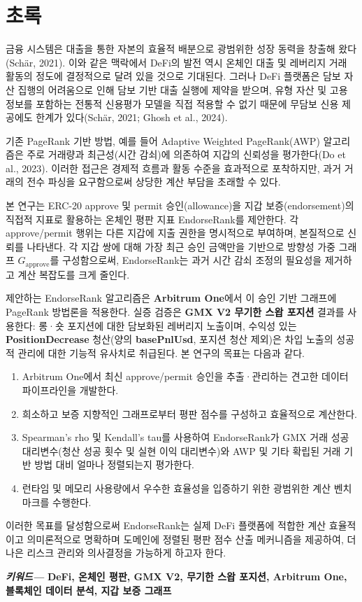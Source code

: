 \section*{초록}
\label{sec:abstract}

금융 시스템은 대출을 통한 자본의 효율적 배분으로 광범위한 성장 동력을 창출해 왔다(Sch\"{a}r, 2021). 이와 같은 맥락에서 DeFi의 발전 역시 온체인 대출 및 레버리지 거래 활동의 정도에 결정적으로 달려 있을 것으로 기대된다. 그러나 DeFi 플랫폼은 담보 자산 집행의 어려움으로 인해 담보 기반 대출 실행에 제약을 받으며, 유형 자산 및 고용 정보를 포함하는 전통적 신용평가 모델을 직접 적용할 수 없기 때문에 무담보 신용 제공에도 한계가 있다(Sch\"{a}r, 2021; Ghosh et al., 2024).


기존 PageRank 기반 방법, 예를 들어 Adaptive Weighted PageRank(AWP) 알고리즘은 주로 거래량과 최근성(시간 감쇠)에 의존하여 지갑의 신뢰성을 평가한다(Do et al., 2023). 이러한 접근은 경제적 흐름과 활동 수준을 효과적으로 포착하지만, 과거 거래의 전수 파싱을 요구함으로써 상당한 계산 부담을 초래할 수 있다.


본 연구는 ERC-20 approve 및 permit 승인(allowance)을 지갑 보증(endorsement)의 직접적 지표로 활용하는 온체인 평판 지표 EndorseRank를 제안한다. 각 approve/permit 행위는 다른 지갑에 지출 권한을 명시적으로 부여하며, 본질적으로 신뢰를 나타낸다. 각 지갑 쌍에 대해 가장 최근 승인 금액만을 기반으로 방향성 가중 그래프 $G_{\text{approve}}$를 구성함으로써, EndorseRank는 과거 시간 감쇠 조정의 필요성을 제거하고 계산 복잡도를 크게 줄인다.


제안하는 EndorseRank 알고리즘은 \textbf{Arbitrum One}에서 이 승인 기반 그래프에 PageRank 방법론을 적용한다. 실증 검증은 \textbf{GMX V2 무기한 스왑 포지션} 결과를 사용한다: 롱·숏 포지션에 대한 담보화된 레버리지 노출이며, 수익성 있는 \textbf{PositionDecrease} 청산(양의 \textbf{basePnlUsd}, 포지션 청산 제외)은 차입 노출의 성공적 관리에 대한 기능적 유사치로 취급된다. 본 연구의 목표는 다음과 같다.


\begin{enumerate}
\item[1.] Arbitrum One에서 최신 approve/permit 승인을 추출·관리하는 견고한 데이터 파이프라인을 개발한다.
\item[2.] 희소하고 보증 지향적인 그래프로부터 평판 점수를 구성하고 효율적으로 계산한다.
\item[3.] Spearman's rho 및 Kendall's tau를 사용하여 EndorseRank가 GMX 거래 성공 대리변수(청산 성공 횟수 및 실현 이익 대리변수)와 AWP 및 기타 확립된 거래 기반 방법 대비 얼마나 정렬되는지 평가한다.
\item[4.] 런타임 및 메모리 사용량에서 우수한 효율성을 입증하기 위한 광범위한 계산 벤치마크를 수행한다.
\end{enumerate}
이러한 목표를 달성함으로써 EndorseRank는 실제 DeFi 플랫폼에 적합한 계산 효율적이고 의미론적으로 명확하며 도메인에 정렬된 평판 점수 산출 메커니즘을 제공하여, 더 나은 리스크 관리와 의사결정을 가능하게 하고자 한다.


\textbf{\emph{키워드--- }}\textbf{DeFi, 온체인 평판, GMX V2, 무기한 스왑 포지션, Arbitrum One, 블록체인 데이터 분석, 지갑 보증 그래프}
